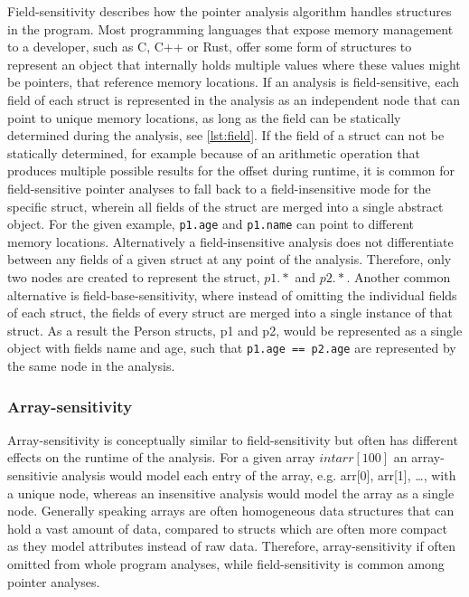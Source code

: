 Field-sensitivity describes how the pointer analysis algorithm handles structures in the program.
Most programming languages that expose memory management to a developer, such as C, C++ or Rust, offer some form of structures to represent an object that internally holds multiple values where these values might be pointers, that reference memory locations.
If an analysis is field-sensitive, each field of each struct is represented in the analysis as an independent node that can point to unique memory locations, as long as the field can be statically determined during the analysis, see \autoref{lst:field}.
If the field of a struct can not be statically determined, for example because of an arithmetic operation that produces multiple possible results for the offset during runtime, it is common for field-sensitive pointer analyses to fall back to a field-insensitive mode for the specific struct, wherein all fields of the struct are merged into a single abstract object.
For the given example, \verb|p1.age| and \verb|p1.name| can point to different memory locations.
Alternatively a field-insensitive analysis does not differentiate between any fields of a given struct at any point of the analysis.
Therefore, only two nodes are created to represent the struct, $p1.*$ and $p2.*$.
Another common alternative is field-base-sensitivity, where instead of omitting the individual fields of each struct, the fields of every struct are merged into a single instance of that struct.
As a result the Person structs, p1 and p2, would be represented as a single object with fields name and age, such that \verb|p1.age == p2.age| are represented by the same node in the analysis.

\subsubsection{Array-sensitivity}
Array-sensitivity is conceptually similar to field-sensitivity but often has different effects on the runtime of the analysis.
For a given array $int arr[100]$ an array-sensitivie analysis would model each entry of the array, e.g. arr[0], arr[1], \dots, with a unique node, whereas an insensitive analysis would model the array as a single node.
Generally speaking arrays are often homogeneous data structures that can hold a vast amount of data, compared to structs which are often more compact as they model attributes instead of raw data.
Therefore, array-sensitivity if often omitted from whole program analyses, while field-sensitivity is common among pointer analyses.

